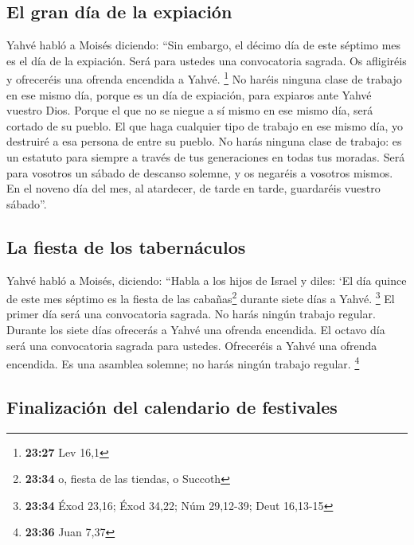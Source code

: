 \hypertarget{el-gran-duxeda-de-la-expiaciuxf3n}{%
\subsection{El gran día de la
expiación}\label{el-gran-duxeda-de-la-expiaciuxf3n}}

 Yahvé habló a Moisés diciendo:  ``Sin
embargo, el décimo día de este séptimo mes es el día de la expiación.
Será para ustedes una convocatoria sagrada. Os afligiréis y ofreceréis
una ofrenda encendida a Yahvé. \footnote{\textbf{23:27} Lev 16,1}
 No haréis ninguna clase de trabajo en ese mismo día,
porque es un día de expiación, para expiaros ante Yahvé vuestro Dios.
 Porque el que no se niegue a sí mismo en ese mismo día,
será cortado de su pueblo.  El que haga cualquier tipo de
trabajo en ese mismo día, yo destruiré a esa persona de entre su pueblo.
 No harás ninguna clase de trabajo: es un estatuto para
siempre a través de tus generaciones en todas tus moradas.
 Será para vosotros un sábado de descanso solemne, y os
negaréis a vosotros mismos. En el noveno día del mes, al atardecer, de
tarde en tarde, guardaréis vuestro sábado''.

\hypertarget{la-fiesta-de-los-tabernuxe1culos}{%
\subsection{La fiesta de los
tabernáculos}\label{la-fiesta-de-los-tabernuxe1culos}}

 Yahvé habló a Moisés, diciendo:  ``Habla
a los hijos de Israel y diles: `El día quince de este mes séptimo es la
fiesta de las cabañas\footnote{\textbf{23:34} o, fiesta de las tiendas,
  o Succoth} durante siete días a Yahvé. \footnote{\textbf{23:34} Éxod
  23,16; Éxod 34,22; Núm 29,12-39; Deut 16,13-15}  El
primer día será una convocatoria sagrada. No harás ningún trabajo
regular.  Durante los siete días ofrecerás a Yahvé una
ofrenda encendida. El octavo día será una convocatoria sagrada para
ustedes. Ofreceréis a Yahvé una ofrenda encendida. Es una asamblea
solemne; no harás ningún trabajo regular. \footnote{\textbf{23:36} Juan
  7,37}

\hypertarget{finalizaciuxf3n-del-calendario-de-festivales}{%
\subsection{Finalización del calendario de
festivales}\label{finalizaciuxf3n-del-calendario-de-festivales}}

